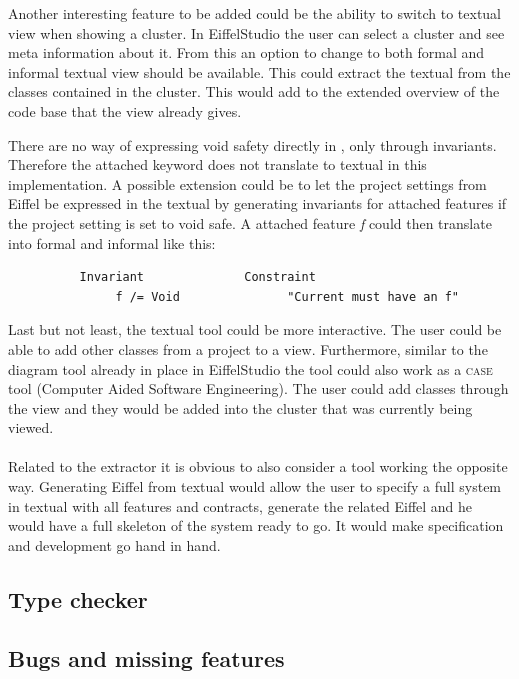 Another interesting feature to be added could be the ability to switch to textual \bon{ } view when showing a cluster. In EiffelStudio the user can select a cluster and see meta information about it. From this an option to change to both formal and informal textual \bon{ } view should be available. This could extract the textual \bon{ } from the classes contained in the cluster. This would add to the extended overview of the code base that the \bon{ } view already gives.

There are no way of expressing void safety directly in \bon, only through invariants. Therefore the attached keyword does not translate to textual \bon{ } in this implementation. A possible extension could be to let the project settings from Eiffel be expressed in the textual \bon{ } by generating invariants for attached features if the project setting is set to void safe. A attached feature \textit{f} could then translate into formal and informal \bon{ } like this:
\footnotesize
\begin{verbatim}
          Invariant              Constraint
               f /= Void               "Current must have an f"
\end{verbatim}

\normalsize Last but not least, the textual \bon{ } tool could be more interactive. The user could be able to add other classes from a project to a \bon{ } view. Furthermore, similar to the diagram tool already in place in EiffelStudio the \bon{ } tool could also work as a \textsc{case} tool (Computer Aided Software Engineering). The user could add classes through the \bon{ } view and they would be added into the cluster that was currently being viewed.

\paragraph{}
Related to the \bon{ } extractor it is obvious to also consider a tool working the opposite way. Generating Eiffel from textual \bon{ } would allow the user to specify a full system in textual \bon{ } with all features and contracts, generate the related Eiffel and he would have a full skeleton of the system ready to go. It would make specification and development go hand in hand.

\subsection{Type checker}
\subsection{Bugs and missing features}
